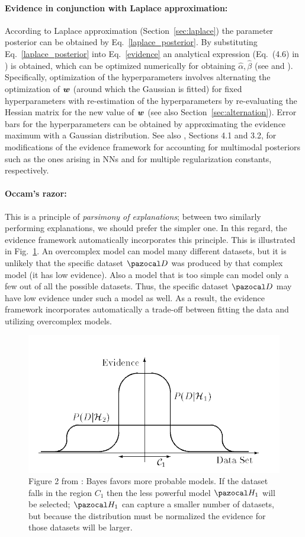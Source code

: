 \paragraph{Evidence in conjunction with Laplace approximation:} 
According to Laplace approximation (Section~\ref{sec:laplace}) the parameter posterior can be obtained by Eq.~\eqref{laplace_posterior}. 
By substituting Eq.~\eqref{laplace_posterior} into Eq.~\eqref{evidence} an analytical expression (Eq.~(4.6) in \cite{mackay1992bayesian}) is obtained, which can be optimized numerically for obtaining $\hat{\alpha}, \hat{\beta}$ (see \cite{mackay1992bayesian} and \cite{mackay1992practical}). 
Specifically, optimization of the hyperparameters involves alternating the optimization of $\boldsymbol{w}$ (around which the Gaussian is fitted) for fixed hyperparameters with re-estimation of the hyperparameters by re-evaluating the Hessian matrix for the new value of $\boldsymbol{w}$ (see also Section~\ref{sec:alternation}).
Error bars for the hyperparameters can be obtained by approximating the evidence maximum with a Gaussian distribution. 
See also \textcite{mackay1995probable}, Sections 4.1 and 3.2, for modifications of the evidence framework for accounting for multimodal posteriors such as the ones arising in NNs and for multiple regularization constants, respectively.

\paragraph{Occam's razor:}
This is a principle of \textit{parsimony of explanations}; between two similarly performing explanations, we should prefer the simpler one. 
In this regard, the evidence framework automatically incorporates this principle. 
This is illustrated in Fig.~\ref{fig:occam_1}.
An overcomplex model can model many different datasets, but it is unlikely that the specific dataset $\cD$ was produced by that complex model (it has low evidence). 
Also a model that is too simple can model only a few out of all the possible datasets.
Thus, the specific dataset $\cD$ may have low evidence under such a model as well. 
As a result, the evidence framework incorporates automatically a trade-off between fitting the data and utilizing overcomplex models. 
\begin{figure}
	\centering
	\includegraphics[width=0.7\linewidth]{./Figures/occam_1.png}
	\caption{Figure 2 from \textcite{mackay1992bayesian}: Bayes favors more probable models.
	If the dataset falls in the region $C_1$ then the less powerful model $\cH_1$ will be selected; $\cH_1$ can capture a smaller number of datasets, but because the distribution must be normalized the evidence for those datasets will be larger.}
	\label{fig:occam_1}
\end{figure} 

